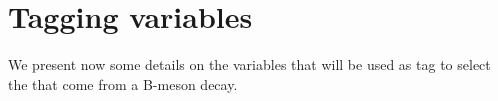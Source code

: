 \section{Tagging variables}
\label{sec:tags}

We present now some details on the variables that will be used as tag to select the \Pgm that come from a B-meson decay.



